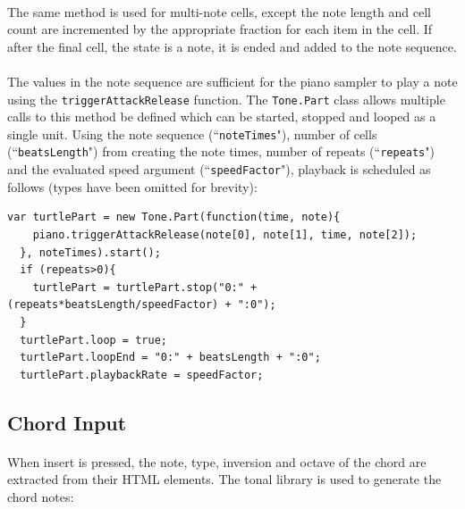 \paragraph{} The same method is used for multi-note cells, except the note length and cell count are incremented by the appropriate fraction for each item in the cell. If after the final cell, the state is a note, it is ended and added to the note sequence.

\paragraph{} The values in the note sequence are sufficient for the piano sampler to play a note using the \texttt{triggerAttackRelease} function. The \texttt{Tone.Part} class allows multiple calls to this method be defined which can be started, stopped and looped as a single unit. Using the note sequence (``\texttt{noteTimes}"), number of cells (``\texttt{beatsLength}") from creating the note times, number of repeats (``\texttt{repeats}") and the evaluated speed argument (``\texttt{speedFactor}"), playback is scheduled as follows (types have been omitted for brevity):


\begin{lstlisting}[style=js]
  var turtlePart = new Tone.Part(function(time, note){
    piano.triggerAttackRelease(note[0], note[1], time, note[2]);
  }, noteTimes).start();
  if (repeats>0){
    turtlePart = turtlePart.stop("0:" + (repeats*beatsLength/speedFactor) + ":0");
  }
  turtlePart.loop = true;
  turtlePart.loopEnd = "0:" + beatsLength + ":0";
  turtlePart.playbackRate = speedFactor;
\end{lstlisting}

\subsection{Chord Input}

\paragraph{} When insert is pressed, the note, type, inversion and octave of the chord are extracted from their HTML elements. The tonal library is used to generate the chord notes:

